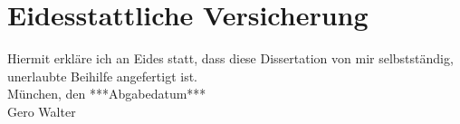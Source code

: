 

\chapter*{Eidesstattliche Versicherung}

Hiermit erkläre ich an Eides statt, dass diese Dissertation von mir
selbstständig, unerlaubte Beihilfe angefertigt ist.\\[3ex]

München, den ***Abgabedatum***\\[2ex]
\hspace*{0.5\textwidth} {\small Gero Walter}


